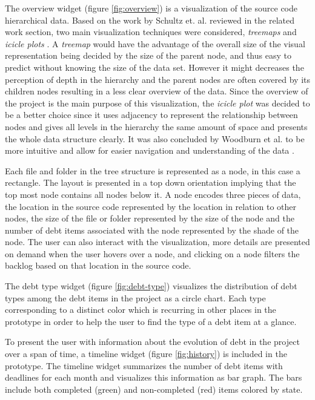 The overview widget (figure \ref{fig:overview}) is a visualization of the source code hierarchical data.
Based on the work by Schultz et. al. reviewed in the related work section, two main visualization techniques were considered, \textit{treemaps} and \textit{icicle plots} \cite{schulz_design_2011}.
A \textit{treemap} would have the advantage of the overall size of the visual representation being decided by the size of the parent node, and thus easy to predict without knowing the size of the data set.
However it might decreases the perception of depth in the hierarchy and the parent nodes are often covered by its children nodes resulting in a less clear overview of the data.
Since the overview of the project is the main purpose of this visualization, the \textit{icicle plot} was decided to be a better choice since it uses adjacency to represent the relationship between nodes and gives all levels in the hierarchy the same amount of space and presents the whole data structure clearly.
It was also concluded by Woodburn et al. to be more intuitive and allow for easier navigation and understanding of the data \cite{woodburn_interactive_2019}.

Each file and folder in the tree structure is represented as a node, in this case a rectangle.
The layout is presented in a top down orientation implying that the top most node contains all nodes below it.
A node encodes three pieces of data, the location in the source code represented by the location in relation to other nodes, the size of the file or folder represented by the size of the node and the number of debt items associated with the node represented by the shade of the node.
The user can also interact with the visualization, more details are presented on demand when the user hovers over a node, and clicking on a node filters the backlog based on that location in the source code.





The debt type widget (figure \ref{fig:debt-type}) visualizes the distribution of debt types among the debt items in the project as a circle chart.
Each type corresponding to a distinct color which is recurring in other places in the prototype in order to help the user to find the type of a debt item at a glance.

To present the user with information about the evolution of debt in the project over a span of time, a timeline widget (figure \ref{fig:history}) is included in the prototype.
The timeline widget summarizes the number of debt items with deadlines for each month and visualizes this information as bar graph.
The bars include both completed (green) and non-completed (red) items colored by state.


